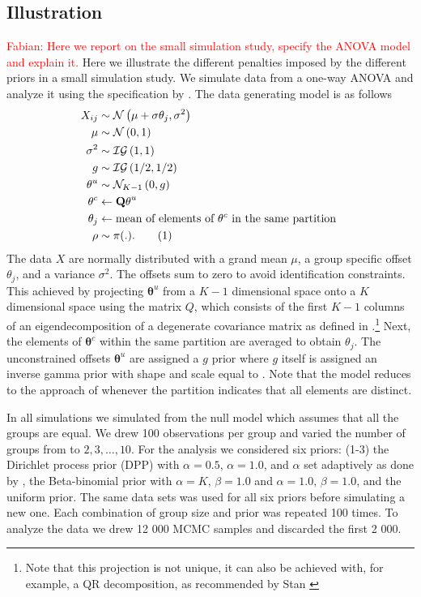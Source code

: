 \documentclass[11pt,a4paper]{article}
\theoremstyle{definition} %
\theoremstyle{case}
\newcommand{\numberthis}{\addtocounter{equation}{1}\tag{\theequation}}
\newcommand{\FD}[1]{\textcolor{red}{Fabian: #1 }}
\begin{document}
\subsection{Illustration} \label{sec:illustration}
\FD{Here we report on the small simulation study, specify the ANOVA model and explain it.}
Here we illustrate the different penalties imposed by the different priors in a small simulation study. We simulate data from a one-way ANOVA and analyze it using the specification by \textcite{rouder2012default}. The data generating model is as follows
\begin{align*}
    X_{ij}              &\sim \mathcal{N}\left(\mu + \sigma\theta_j, \sigma^2\right)\\
    \mu                 &\sim \mathcal{N}\left(0, 1\right)  \\
    \sigma^2            &\sim \mathcal{IG}\left(1, 1\right) \\
    g                   &\sim \mathcal{IG}\left(1/2, 1/2\right) \\
    \mathbf{\theta}^u   &\sim \mathcal{N}_{K-1}\left(0, g\right)   \\
    \mathbf{\theta}^c   &\leftarrow \mathbf{Q\theta}^u \\
    \theta_j            &\leftarrow \text{mean of elements of } \theta^c \text{ in the same partition }\\
    \rho                &\sim \pi(.).\numberthis
\end{align*}
The data $X$ are normally distributed with a grand mean $\mu$, a group specific offset $\theta_j$, and a variance $\sigma^2$. The offsets sum to zero to avoid identification constraints. This achieved by projecting $\mathbf{\theta}^u$ from a $K-1$ dimensional space onto a $K$ dimensional space using the matrix $Q$, which consists of the first $K-1$ columns of an eigendecomposition of a degenerate covariance matrix as defined in \textcite{rouder2012default}.\footnote{Note that this projection is not unique, it can also be achieved with, for example, a QR decomposition, as recommended by Stan \parencite{stanUserManual}} Next, the elements of $\mathbf{\theta}^c$ within the same partition are averaged to obtain $\theta_j$. The unconstrained offsets $\mathbf{\theta}^u$ are assigned a $g$ prior where $g$ itself is assigned an inverse gamma prior with shape and scale equal to . Note that the model reduces to the approach of \textcite{rouder2012default} whenever the partition indicates that all elements are distinct.

In all simulations we simulated from the null model which assumes that all the groups are equal. We drew 100 observations per group and varied the number of groups from to $2, 3, \dots, 10$. For the analysis we considered six priors: (1-3) the Dirichlet process prior (DPP) with $\alpha =0.5$, $\alpha=1.0$, and $\alpha$ set adaptively as done by \textcite{gopalan1998bayesian}, the Beta-binomial prior with $\alpha=K,\,\beta=1.0$ and $\alpha=1.0,\,\beta=1.0$, and the uniform prior. The same data sets was used for all six priors before simulating a new one. Each combination of group size and prior was repeated 100 times. To analyze the data we drew 12 000 MCMC samples and discarded the first 2 000.
\end{document}
